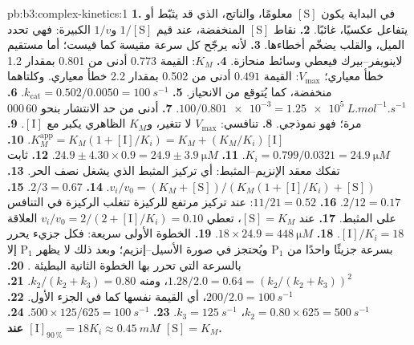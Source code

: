 \begin{solution}{pb:b3:complex-kinetics:1}
\textbf{1.} في البداية يكون $[\mathrm S]$ معلومًا، والناتج، الذي قد يثبّط أو يتفاعل
عكسيًا، غائبًا.
\textbf{2.} نقاط $[\mathrm S]$ المنخفضة، عند قيم $1/[\mathrm S]$ و$1/v$ الكبيرة: فهي تحدد الميل، 
والقلب يضخّم أخطاءها.
\textbf{3.} لأنه يرجّح كل سرعة مقيسة كما قيست؛ أما مستقيم لاينويفر--بيرك فيعطي
وسائط منحازة.
\textbf{4.} $K_M$: القيمة $0.773$ أدنى من 0.801 بمقدار 1.2 خطأ معياري؛ $V_{\max}$: القيمة $0.491$ أدنى من 0.502 بمقدار 2.2
خطأ معياري. وكلتاهما منخفضة، كما يُتوقع من الانحياز.
\textbf{5.} $k_{\mathrm{cat}} = 0.502/0.0050 = \qty{100}{s^{-1}}$.
\textbf{6.} $100/\num{0.801e-3} = \qty{1.25e5}{L.mol^{-1}.s^{-1}}$.
\textbf{7.} أدنى من حد الانتشار بنحو 60\,000 مرة؛ فهو  نموذجي.
\textbf{8.} تنافسي: $V_{\max}$ لا تتغير، و$K_M$ الظاهري يكبر مع $[\mathrm I]$.
\textbf{9.} $K_M^{\mathrm{app}} = K_M(1 + [\mathrm I]/K_i) = K_M + (K_M/K_i)[\mathrm I]$.
\textbf{10.} $K_i = 0.799/0.0321 = \qty{24.9}{\micro M}$.
\textbf{11.} $24.9 \pm 4.30 \times 0.9 = 24.9 \pm \qty{3.9}{\micro M}$.
\textbf{12.} ثابت تفكك معقد الإنزيم--المثبط: أي تركيز
المثبط الذي يشغل نصف  الحر.
\textbf{13.} $v_i/v_0 = (K_M + [\mathrm S])/(K_M(1 + [\mathrm I]/K_i) + [\mathrm S])$.
\textbf{14.} $2/3 = 0.67$.
\textbf{15.} $2/12 = 0.17$.
\textbf{16.} $11/21 = 0.52$: عند تركيز مرتفع للركيزة تتغلب الركيزة في التنافس على
المثبط.
\textbf{17.} عند $[\mathrm S] = K_M$، تعطي $v_i/v_0 = 2/(2 + [\mathrm I]/K_i) = 0.10$ العلاقة $[\mathrm I]/K_i = 18$.
\textbf{18.} $18 \times 24.9 = \qty{448}{\micro M}$.
\textbf{19.} الخطوة الأولى سريعة: فكل جزيء  يحرر بسرعة جزيئًا واحدًا من $\mathrm P_1$
ويُحتجز في صورة الأسيل--إنزيم؛ وبعد ذلك لا يظهر $\mathrm P_1$ إلا بالسرعة التي تحرر بها
الخطوة الثانية البطيئة .
\textbf{20.} $1.28/2.0 = 0.64 = (k_2/(k_2 + k_3))^2$، ومنه $k_2/(k_2 + k_3) = 0.80$.
\textbf{21.} $200/2.0 = \qty{100}{s^{-1}}$، أي القيمة نفسها كما في الجزء الأول.
\textbf{22.} $k_2 = 0.80 \times 625 = \qty{500}{s^{-1}}$، $k_3 = \qty{125}{s^{-1}}$.
\textbf{23.} $500 \times 125/625 = \qty{100}{s^{-1}}$.
\textbf{24.} \textbf{$[\mathrm I]_{90\,\%} = 18K_i \approx \qty{0.45}{mM}$ عند $[\mathrm S] = K_M$.}
\end{solution}
